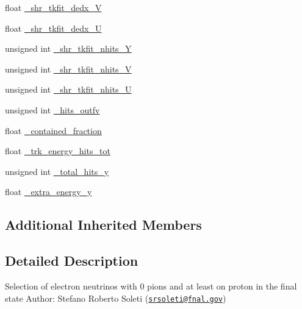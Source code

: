\begin{DoxyCompactItemize}
\item 
float \hyperlink{classselection_1_1CC0piNpSelection_a428fc549513bea0e1ca92cf90c1148cd}{\-\_\-shr\-\_\-tkfit\-\_\-dedx\-\_\-\-V}
\item 
float \hyperlink{classselection_1_1CC0piNpSelection_aaaef69409457695e2300bf847a13804c}{\-\_\-shr\-\_\-tkfit\-\_\-dedx\-\_\-\-U}
\item 
unsigned int \hyperlink{classselection_1_1CC0piNpSelection_ae3a53326b19594013c9df08b66ccaa73}{\-\_\-shr\-\_\-tkfit\-\_\-nhits\-\_\-\-Y}
\item 
unsigned int \hyperlink{classselection_1_1CC0piNpSelection_adab23c54dd799cdf83c31a10e4ae9061}{\-\_\-shr\-\_\-tkfit\-\_\-nhits\-\_\-\-V}
\item 
unsigned int \hyperlink{classselection_1_1CC0piNpSelection_a6c75f5783174133ce97849f128f3dee3}{\-\_\-shr\-\_\-tkfit\-\_\-nhits\-\_\-\-U}
\item 
unsigned int \hyperlink{classselection_1_1CC0piNpSelection_ac39ec79d190fb925f8d20b03cbeb0605}{\-\_\-hits\-\_\-outfv}
\item 
float \hyperlink{classselection_1_1CC0piNpSelection_a8e7933222bce1424aee24bae8dcf4864}{\-\_\-contained\-\_\-fraction}
\item 
float \hyperlink{classselection_1_1CC0piNpSelection_a82a48c6128c34252642d237b98f1b66a}{\-\_\-trk\-\_\-energy\-\_\-hits\-\_\-tot}
\item 
unsigned int \hyperlink{classselection_1_1CC0piNpSelection_a819d1d973e74bcd2ad82aa01ea24ac37}{\-\_\-total\-\_\-hits\-\_\-y}
\item 
float \hyperlink{classselection_1_1CC0piNpSelection_a2e386c361ecc27d22ff2642e80a629e4}{\-\_\-extra\-\_\-energy\-\_\-y}
\end{DoxyCompactItemize}
\subsection*{Additional Inherited Members}


\subsection{Detailed Description}
Selection of electron neutrinos with 0 pions and at least on proton in the final state Author\-: Stefano Roberto Soleti (\href{mailto:srsoleti@fnal.gov}{\tt srsoleti@fnal.\-gov}) 

